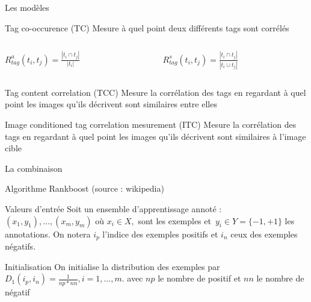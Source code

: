 \documentclass{beamer}
\begin{document}
\begin{frame}{Les modèles}
	
    \begin{block}{Tag co-occurence (TC)}
    Mesure à quel point deux différents tags sont corrélés\\
    \begin{columns}
        \begin{column}{0.3\textwidth}
            $R_{tag}^a(t_i,t_j) = \frac{|t_i \cap t_j|}{|t_i|}$
        \end{column}
        \begin{column}{0.3\textwidth}
            $R_{tag}^s(t_i,t_j) = \frac{|t_i \cap t_j|}{|t_i \cup t_j|}$
        \end{column}
    \end{columns}
    \end{block}

    \begin{block}{Tag content correlation (TCC)}
    Mesure la corrélation des tags en regardant à quel point les images qu'ils décrivent sont similaires entre elles
    \end{block}

    \begin{block}{Image conditioned tag correlation mesurement (ITC)}
    Mesure la corrélation des tags en regardant à quel point les images qu'ils décrivent sont similaires à l'image cible
    \end{block}

\end{frame}

\begin{frame}{La combinaison}
	
	Algorithme Rankboost (source : wikipedia)

    \begin{block}{Valeurs d'entrée}
    Soit un ensemble d'apprentissage annoté : $(x_{1},y_{1}),\ldots,(x_{m},y_{m})$ où $x_{i} \in X,$ sont les exemples et $\, y_{i} \in Y = \{-1, +1\}$ les annotations.
    On notera $i_p$ l'indice des exemples positifs et $i_n$ ceux des exemples négatifs.
    \end{block}

    \begin{block}{Initialisation}
    On initialise la distribution des exemples par $D_{1}(i_p,i_n) = \frac{1}{np*nn}, i=1,\ldots,m.$ avec $np$ le nombre de positif et $nn$ le nombre de négatif
    \end{block}

\end{frame}
\end{document}
